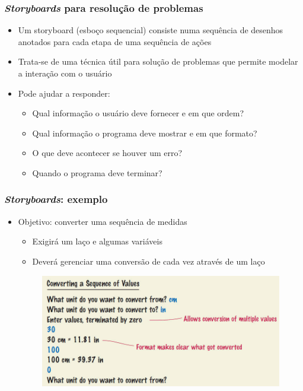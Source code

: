 \documentclass[xcolor={dvipsnames,table},aspectratio=169]{beamer}
\begin{document}
\begin{frame}\frametitle{\emph{Storyboards} para resolução de problemas}
\begin{itemize}
	\item Um storyboard (esboço sequencial) consiste numa sequência de desenhos anotados para cada etapa de uma sequência de ações
	\item Trata-se de uma técnica útil para solução de problemas que permite modelar a interação com o usuário
	\item Pode ajudar a responder:
	\begin{itemize}
		\item Qual informação o usuário deve fornecer e em que ordem?
		\item Qual informação o programa deve mostrar e em que formato?
		\item O que deve acontecer se houver um erro?
		\item Quando o programa deve terminar?
	\end{itemize}
\end{itemize}
\end{frame}

\begin{frame}\frametitle{\emph{Storyboards}: exemplo}
\begin{itemize}
	\item Objetivo: converter uma sequência de medidas
	\begin{itemize}
		\item Exigirá um laço e algumas variáveis
		\item Deverá gerenciar uma conversão de cada vez através de um laço
	\end{itemize}
\begin{figure}[h]
	\includegraphics[height=0.5\paperheight,center]{pucrs-ep-fprog-unidade_04-lacos-laminas-storyboards1.jpg}
\end{figure}
\end{itemize}
\end{frame}
\end{document}
